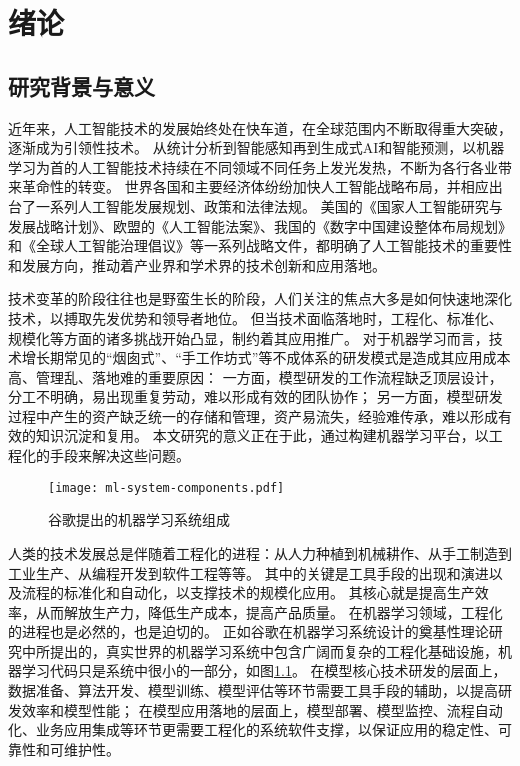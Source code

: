 
\chapter{绪论}


%
\section{研究背景与意义}

近年来，人工智能技术的发展始终处在快车道，在全球范围内不断取得重大突破，逐渐成为引领性技术。
从统计分析到智能感知再到生成式AI和智能预测，以机器学习为首的人工智能技术持续在不同领域不同任务上发光发热，不断为各行各业带来革命性的转变。
世界各国和主要经济体纷纷加快人工智能战略布局，并相应出台了一系列人工智能发展规划、政策和法律法规。
美国的《国家人工智能研究与发展战略计划》、欧盟的《人工智能法案》、我国的《数字中国建设整体布局规划》和《全球人工智能治理倡议》等一系列战略文件，都明确了人工智能技术的重要性和发展方向，推动着产业界和学术界的技术创新和应用落地。

技术变革的阶段往往也是野蛮生长的阶段，人们关注的焦点大多是如何快速地深化技术，以搏取先发优势和领导者地位。
但当技术面临落地时，工程化、标准化、规模化等方面的诸多挑战开始凸显，制约着其应用推广。
对于机器学习而言，技术增长期常见的“烟囱式”、“手工作坊式”等不成体系的研发模式是造成其应用成本高、管理乱、落地难的重要原因：
一方面，模型研发的工作流程缺乏顶层设计，分工不明确，易出现重复劳动，难以形成有效的团队协作；
另一方面，模型研发过程中产生的资产缺乏统一的存储和管理，资产易流失，经验难传承，难以形成有效的知识沉淀和复用。
本文研究的意义正在于此，通过构建机器学习平台，以工程化的手段来解决这些问题。

\begin{figure}
  \centering
  \texttt{[image: ml-system-components.pdf]}
  \caption{谷歌提出的机器学习系统组成}
  \label{fig:mlcomponents}
\end{figure}

人类的技术发展总是伴随着工程化的进程：从人力种植到机械耕作、从手工制造到工业生产、从编程开发到软件工程等等。
其中的关键是工具手段的出现和演进以及流程的标准化和自动化，以支撑技术的规模化应用。
其核心就是提高生产效率，从而解放生产力，降低生产成本，提高产品质量。
在机器学习领域，工程化的进程也是必然的，也是迫切的。
正如谷歌在机器学习系统设计的奠基性理论研究中所提出的，真实世界的机器学习系统中包含广阔而复杂的工程化基础设施，机器学习代码只是系统中很小的一部分，如图\ref{fig:mlcomponents}。
在模型核心技术研发的层面上，数据准备、算法开发、模型训练、模型评估等环节需要工具手段的辅助，以提高研发效率和模型性能；
在模型应用落地的层面上，模型部署、模型监控、流程自动化、业务应用集成等环节更需要工程化的系统软件支撑，以保证应用的稳定性、可靠性和可维护性。

